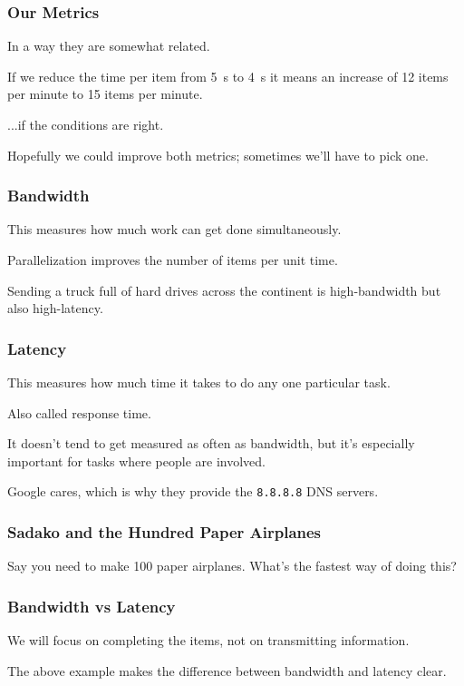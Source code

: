 \begin{frame}
\frametitle{Our Metrics}

In a way they are somewhat related. 

If we reduce the time per item from 5~s to 4~s it means an increase of 12 items per minute to 15 items per minute.

...if the conditions are right. 

Hopefully we could improve both metrics; sometimes we'll have to pick one.



\end{frame}

\begin{frame}
\frametitle{Bandwidth}

This measures how much work can get 
done simultaneously.

Parallelization improves the number
of items per unit time. 

Sending a truck full of hard drives across the continent is high-bandwidth but also high-latency.



\end{frame}




\begin{frame}
\frametitle{Latency}

This measures how much time it takes to do
any one particular task.

Also called response time.

It doesn't tend to get measured as often as bandwidth, but it's especially
important for tasks where people are involved. 

Google cares, which is why they provide the {\tt 8.8.8.8} DNS servers.



\end{frame}


\begin{frame}
\frametitle{Sadako and the Hundred Paper Airplanes}

 Say you need to make
100 paper airplanes. What's the fastest way of doing this?



\end{frame}


\begin{frame}
\frametitle{Bandwidth vs Latency}


\begin{center}
\end{center}

We will focus on completing the items, not on transmitting information.

The above example makes the difference between bandwidth and latency clear.

\end{frame}


